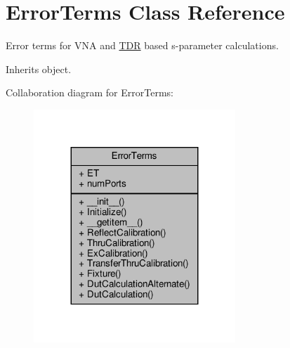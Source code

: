\hypertarget{classSignalIntegrity_1_1Measurement_1_1Calibration_1_1ErrorTerms_1_1ErrorTerms}{}\section{Error\+Terms Class Reference}
\label{classSignalIntegrity_1_1Measurement_1_1Calibration_1_1ErrorTerms_1_1ErrorTerms}


Error terms for V\+NA and \hyperlink{namespaceSignalIntegrity_1_1Measurement_1_1TDR}{T\+DR} based s-\/parameter calculations.  




Inherits object.



Collaboration diagram for Error\+Terms\+:
\nopagebreak
\begin{figure}[H]
\begin{center}
\leavevmode
\includegraphics[width=215pt]{classSignalIntegrity_1_1Measurement_1_1Calibration_1_1ErrorTerms_1_1ErrorTerms__coll__graph}
\end{center}
\end{figure}

